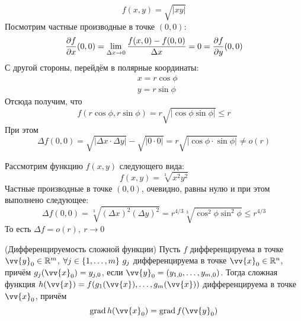 \begin{example}
	\[
		f(x, y) = \sqrt{|xy|}
	\]
	Посмотрим частные производные в точке $(0, 0)$:
	\[
		\frac{\partial f}{\partial x} (0, 0) = \lim\limits_{\Delta x \to 0} \frac{f(x, 0) - f(0, 0)}{\Delta x} = 0 = \frac{\partial f}{\partial y} (0, 0)
	\]
	С другой стороны, перейдём в полярные координаты:
	\begin{align*}
		&{x = r \cos \phi}
		\\
		&{y = r \sin \phi}
	\end{align*}
	Отсюда получим, что
	\[
		f(r \cos \phi, r \sin \phi) = r \sqrt{|\cos \phi \sin \phi|} \le r
	\]
	При этом
	\[
		\Delta f(0, 0) = \sqrt{|\Delta x \cdot \Delta y|} - \sqrt{|0 \cdot 0|} = r \sqrt{|\cos \phi \cdot \sin \phi|} \neq o(r)
	\]
\end{example}
\begin{example}
	Рассмотрим функцию $f(x, y)$ следующего вида:
	\[
		f(x, y) = \sqrt[3]{x^2 y^2}
	\]
	Частные производные в точке $(0, 0)$, очевидно, равны нулю и при этом выполнено следующее:
	\[
		\Delta f(0, 0) = \sqrt[3]{(\Delta x)^2 (\Delta y)^2} = r^{4/3} \sqrt[3]{\cos^2 \phi \sin^2 \phi} \le r^{4/3}
	\]
	То есть $\Delta f = o(r),\ r \to 0$
\end{example}

\begin{theorem} (Дифференцируемость сложной функции)
	Пусть $f$ дифференцируема в точке $\vv{y}_0 \in \R^m$, $\forall j \in \range{m}\ g_j$ дифференцируема в точке $\vv{x}_0 \in \R^n$, причём $g_j(\vv{x}_0) = y_{j, 0}$, если $\vv{y}_0 = (y_{1, 0}, \ldots, y_{m, 0})$. Тогда сложная функция $h(\vv{x}) = f(g_1(\vv{x}), \ldots, g_m(\vv{x}))$ дифференцируема в точке $\vv{x}_0$, причём
	\[
		\grad h(\vv{x}_0) = \grad f(\vv{y}_0)
	\]
\end{theorem}

